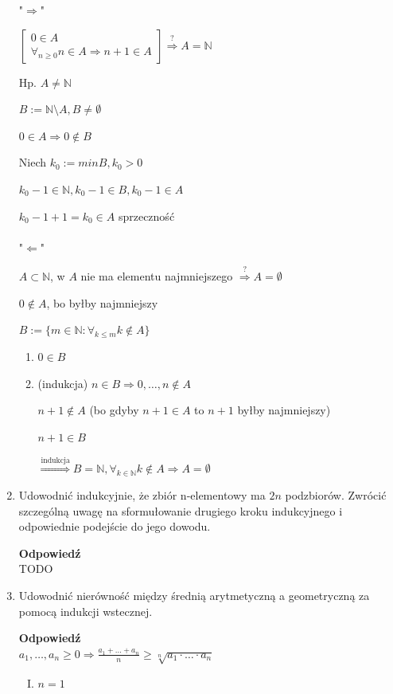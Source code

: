 \documentclass[12pt,a4paper]{article}
\theoremstyle{break}
\newcommand{\Odp}[1]{
		\begin{mdframed}[style=zadanie]
			\textbf{Odpowiedź}\\
			#1
		\end{mdframed}
	}
\begin{document}
\begin{enumerate}[1.]
{		"$\Rightarrow$"
		
		$\begin{bmatrix}
			0\in A\\
			\forall_{n\geq 0} n\in A \Rightarrow n+1\in A
		\end{bmatrix} \overset{?}{\Rightarrow} A=\mathbb{N} $
	
		Hp. $A\neq \mathbb{N}$
		
		$B:= \mathbb{N}\setminus A, B\neq \emptyset$
		
		$0\in A \Rightarrow 0\notin B$
		
		Niech $k_0:= min B, k_0 >0$
		
		$k_0-1 \in \mathbb{N}, k_0-1\in B, k_0-1\in A$
		
		$k_0-1+1 = k_0 \in A$ sprzeczność\\\\
		
		"$\Leftarrow$"
		
		$A\subset \mathbb{N}$, w $A$ nie ma elementu najmniejszego $\overset{?}{\Rightarrow} A=\emptyset$
		
		$0\notin A$, bo byłby najmniejszy
		
		$B:= \{ m\in \mathbb{N}:\forall_{k\leq m} k\notin A\}$
		
		\begin{enumerate}[I]
			\item $0\in B$
			\item (indukcja) $n\in B \Rightarrow 0,\dots,n\notin A$
			
			$n+1\notin A$ (bo gdyby $n+1\in A$ to $n+1$ byłby najmniejszy)
			
			$n+1\in B$
			
			$\overset{\text{indukcja}}{\Rightarrow} B=\mathbb{N}, \forall_{k\in \mathbb{N}} k\notin A \Rightarrow A=\emptyset$
		\end{enumerate}
	}
	
	\item Udowodnić indukcyjnie, że zbiór n-elementowy ma $2n$ podzbiorów. Zwrócić szczególną uwagę na sformułowanie drugiego kroku indukcyjnego i odpowiednie podejście do jego dowodu.
	\Odp{
		TODO
	}
	
	\item Udowodnić nierówność między średnią arytmetyczną a geometryczną za pomocą indukcji wstecznej.
	\Odp{
		$a_1,\dots,a_n\geq 0 \Rightarrow \frac{a_1+\dots+a_n}{n}\geq \sqrt[n]{a_1\cdot \dots \cdot a_n}$
		
		\begin{enumerate}[I)]
			\item $n=1$
			

\end{enumerate}}
\end{enumerate}
\end{document}
